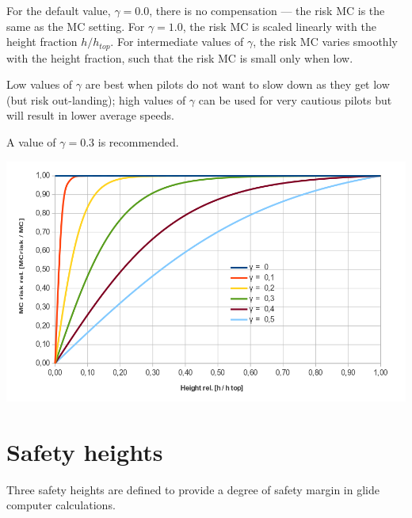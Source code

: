   For the default value, $\gamma=0.0$, there is no compensation ---
  the risk MC is the same as the MC setting.  For $\gamma=1.0$, the
  risk MC is scaled linearly with the height fraction $h/h_{top}$.
  For intermediate values of $\gamma$, the risk MC varies smoothly
  with the height fraction, such that the risk MC is small only when
  low.

  Low values of $\gamma$ are best when pilots do not want to slow down
  as they get low (but risk out-landing); high values of $\gamma$ can
  be used for very cautious pilots but will result in lower average
  speeds.

  A value of $\gamma=0.3$ is recommended.

\begin{center}
\includegraphics[angle=0,width=\linewidth,keepaspectratio='true']{figures/riskmc.png}
\end{center}


\section{Safety heights}\label{sec:safety-heights}

Three safety heights are defined to provide a degree of safety margin
in glide computer calculations.  

